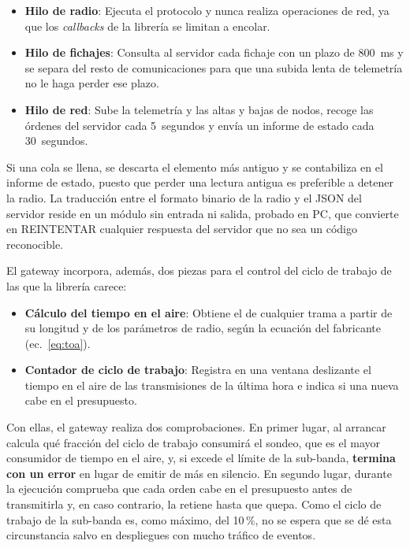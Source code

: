 \begin{itemize}
\item \textbf{Hilo de radio}: Ejecuta el protocolo y nunca realiza operaciones de red, ya que los \textit{callbacks} de la librería se limitan a encolar.

\item \textbf{Hilo de fichajes}: Consulta al servidor cada fichaje con un plazo de 800~ms y se separa del resto de comunicaciones para que una subida lenta de telemetría no le haga perder ese plazo.

\item \textbf{Hilo de red}: Sube la telemetría y las altas y bajas de nodos, recoge las órdenes del servidor cada 5~segundos y envía un informe de estado cada 30~segundos.
\end{itemize}

Si una cola se llena, se descarta el elemento más antiguo y se contabiliza en el informe de estado, puesto que perder una lectura antigua es preferible a detener la radio. La traducción entre el formato binario de la radio y el JSON del servidor reside en un módulo sin entrada ni salida, probado en PC, que convierte en REINTENTAR cualquier respuesta del servidor que no sea un código reconocible.

El gateway incorpora, además, dos piezas para el control del ciclo de trabajo de las que la librería carece:

\begin{itemize}
\item \textbf{Cálculo del tiempo en el aire}: Obtiene el de cualquier trama a partir de su longitud y de los parámetros de radio, según la ecuación del fabricante (ec.~\ref{eq:toa}).

\item \textbf{Contador de ciclo de trabajo}: Registra en una ventana deslizante el tiempo en el aire de las transmisiones de la última hora e indica si una nueva cabe en el presupuesto.
\end{itemize}

Con ellas, el gateway realiza dos comprobaciones. En primer lugar, al arrancar calcula qué fracción del ciclo de trabajo consumirá el sondeo, que es el mayor consumidor de tiempo en el aire, y, si excede el límite de la sub-banda, \textbf{termina con un error} en lugar de emitir de más en silencio. En segundo lugar, durante la ejecución comprueba que cada orden cabe en el presupuesto antes de transmitirla y, en caso contrario, la retiene hasta que quepa. Como el ciclo de trabajo de la sub-banda es, como máximo, del 10\,\%, no se espera que se dé esta circunstancia salvo en despliegues con mucho tráfico de eventos.

